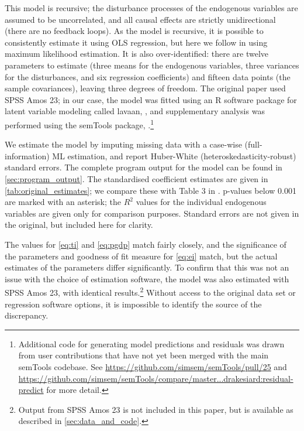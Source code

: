 \documentclass[11pt,a4paper]{article}
\newcommand{\pkg}[1]{{\fontseries{b}\selectfont #1}}
\begin{document}
This model is recursive; the disturbance processes of the endogenous variables are assumed to be uncorrelated, and all causal effects are strictly unidirectional (there are no feedback loops).
As the model is recursive, it is possible to consistently estimate it using OLS regression, but here we follow \cite{panHowIndustrializationTrade2019} in using maximum likelihood estimation.
It is also over-identified: there are twelve parameters to estimate (three means for the endogenous variables, three variances for the disturbances, and six regression coefficients) and fifteen data points (the sample covariances), leaving three degrees of freedom.
The original paper used SPSS Amos 23; in our case, the model was fitted using an R software package for latent variable modeling called \pkg{lavaan}, \cite{rosseelLavaanPackageStructural2012}, and supplementary analysis was performed using the \pkg{semTools} package, \cite{jorgensenSemToolsUsefulTools2019}.\footnote{
Additional code for generating model predictions and residuals was drawn from user contributions that have not yet been merged with the main \pkg{semTools} codebase.
See \url{https://github.com/simsem/semTools/pull/25} and \url{https://github.com/simsem/semTools/compare/master...drakesiard:residual-predict} for more detail.
}

We estimate the model by imputing missing data with a case-wise (full-information) ML estimation, and report Huber-White (heteroskedasticity-robust) standard errors. 
The complete program output for the model can be found in \cref{sec:program_output}.
The standardised coefficient estimates are given in \cref{tab:original_estimates}; we compare these with Table 3 in \cite{panHowIndustrializationTrade2019}.
p-values below 0.001 are marked with an asterisk; the $R^{2}$ values for the individual endogenous variables are given only for comparison purposes.
Standard errors are not given in the original, but included here for clarity.

The values for \cref{eq:ti} and \cref{eq:pgdp} match fairly closely, and the significance of the parameters and goodness of fit measure for \cref{eq:ei} match, but the actual estimates of the parameters differ significantly.
To confirm that this was not an issue with the choice of estimation software, the model was also estimated with SPSS Amos 23, with identical results.\footnote{
Output from SPSS Amos 23 is not included in this paper, but is available as described in \cref{sec:data_and_code}.}
Without access to the original data set or regression software options, it is impossible to identify the source of the discrepancy.
\end{document}
